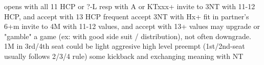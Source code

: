 opens with all 11 HCP or ?-L
    resp with A or KTxxx+
invite to 3NT with 11-12 HCP, and accept with 13 HCP
frequent accept 3NT with Hx+ fit in partner's 6+m
invite to 4M with 11-12 values, and accept with 13+ values
may upgrade or "gamble" a game (ex: with good side suit / distribution), not often downgrade.
1M in 3rd/4th seat could be light
aggresive high level preempt (1st/2nd-seat usually follows 2/3/4 rule)
some kickback and exchanging meaning with NT